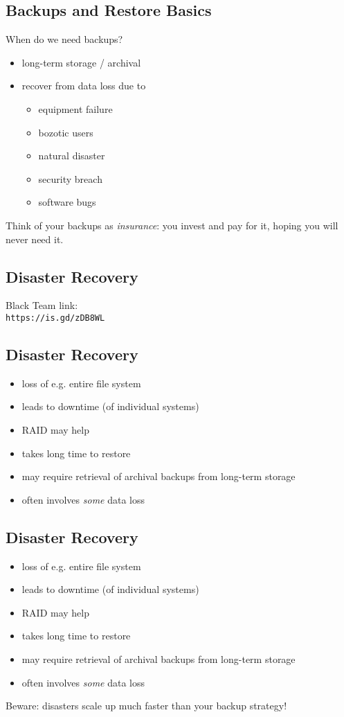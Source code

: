 \documentclass[xga]{xdvislides}
\begin{document}
\subsection{Backups and Restore Basics}
When do we need backups?
\begin{itemize}
	\item long-term storage / archival
	\item recover from data loss due to
		\begin{itemize}
			\item equipment failure
			\item bozotic users
			\item natural disaster
			\item security breach
			\item software bugs
		\end{itemize}
\end{itemize}
\addvspace{.5in}
Think of your backups as {\em insurance}:  you invest and pay for it, hoping
you will never need it.

\subsection{Disaster Recovery}
Black Team link: \\


\verb+https://is.gd/zDB8WL+

\subsection{Disaster Recovery}
\begin{itemize}
	\item loss of e.g. entire file system
	\item leads to downtime (of individual systems)
	\item RAID may help
	\item takes long time to restore
	\item may require retrieval of archival backups from long-term storage 
	\item often involves {\em some} data loss
\end{itemize}

\subsection{Disaster Recovery}
\begin{itemize}
	\item loss of e.g. entire file system
	\item leads to downtime (of individual systems)
	\item RAID may help
	\item takes long time to restore
	\item may require retrieval of archival backups from long-term storage 
	\item often involves {\em some} data loss
\end{itemize}
\vspace{.5in}
Beware: disasters scale up much faster than your
backup strategy!
\end{document}
